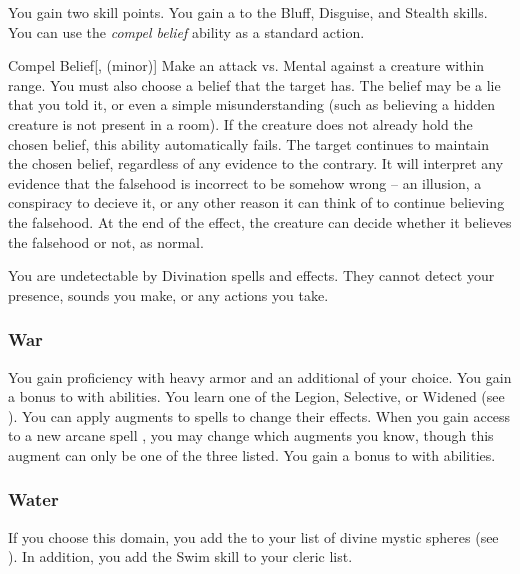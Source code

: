              You gain two skill points.
             You gain a   to the Bluff, Disguise, and Stealth skills.
             You can use the \textit{compel belief} ability as a standard action.
            \begin{freeability}{Compel Belief}[,  (minor)]
                Make an attack vs. Mental against a creature within \rngmed range.
                You must also choose a belief that the target has.
                The belief may be a lie that you told it, or even a simple misunderstanding (such as believing a hidden creature is not present in a room).
                If the creature does not already hold the chosen belief, this ability automatically fails.
                \hit The target continues to maintain the chosen belief, regardless of any evidence to the contrary.
                It will interpret any evidence that the falsehood is incorrect to be somehow wrong -- an illusion, a conspiracy to decieve it, or any other reason it can think of to continue believing the falsehood.
                At the end of the effect, the creature can decide whether it believes the falsehood or not, as normal.
            \end{freeability}
             You are undetectable by Divination spells and effects.
            They cannot detect your presence, sounds you make, or any actions you take.

        \subsubsection{War}
             You gain proficiency with heavy armor and an additional  of your choice.
             You gain a  bonus to  with  abilities.
             You learn one of the Legion, Selective, or Widened  (see ).
            You can apply augments to spells to change their effects.
            When you gain access to a new arcane spell , you may change which augments you know, though this augment can only be one of the three listed.
             You gain a  bonus to  with  abilities.

        \subsubsection{Water}
            If you choose this domain, you add the   to your list of divine mystic spheres (see ).
            In addition, you add the Swim skill to your cleric  list.

